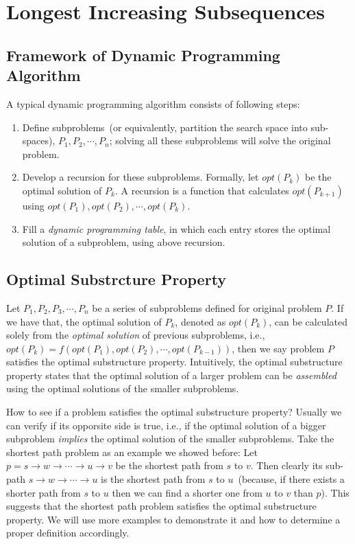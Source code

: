 \section{Longest Increasing Subsequences}

\subsection*{Framework of Dynamic Programming Algorithm}

A typical dynamic programming algorithm consists of following steps:
\vspace*{-\topsep}
\begin{enumerate}
\item Define subproblems~(or equivalently, partition the search space into sub-spaces),
$P_1, P_2, \cdots, P_n$; solving all these subproblems will solve the original problem.
\item Develop a recursion for these subproblems. Formally, let $opt(P_k)$ be the optimal
solution of $P_k$. A recursion is a function that calculates
$opt(P_{k+1})$ using $opt(P_1), opt(P_2), \cdots, opt(P_k)$.
\item Fill a \emph{dynamic programming table},
in which each entry stores the optimal solution of a subproblem, 
using above recursion.
\end{enumerate}

\subsection*{Optimal Substrcture Property}

Let $P_1, P_2, P_3, \cdots, P_n$ be a series of subproblems defined for original problem $P$.
If we have that, the optimal solution of $P_k$, denoted as $opt(P_k)$,
can be calculated solely from the \emph{optimal solution} of previous subproblems,
i.e., $opt(P_k) = f(opt(P_1), opt(P_2), \cdots, opt(P_{k-1}))$,
then we say problem $P$ satisfies the optimal substructure property.
Intuitively, the optimal substructure property states that
the optimal solution of a larger problem can be \emph{assembled}
using the optimal solutions of the smaller subproblems.

How to see if a problem satisfies the optimal substructure property?
Usually we can verify if its opporsite side is true, i.e., if the optimal solution
of a bigger subproblem \emph{implies} the optimal solution of
the smaller subproblems.
Take the shortest path problem as an example we showed before:
Let $p = s \to w \to \cdots \to u \to v$
be the shortest path from $s$ to $v$.
Then clearly its sub-path $s\to w \to \cdots \to u$ is the shortest path from
$s$ to $u$~(because, if there exists a shorter path from $s$ to $u$
then we can find a shorter one from $u$ to $v$ than $p$).
This suggests that the shortest path problem
satisfies the optimal substructure property.
We will use more examples to demonstrate it
and how to determine a proper definition accordingly.


